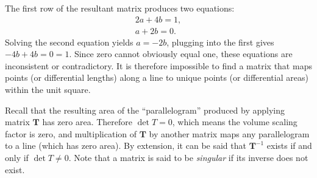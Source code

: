 The first row of the resultant matrix produces two equations:
\begin{subequations}
\begin{align}
  2a + 4b = 1, \\
   a + 2b = 0.
\end{align}
\end{subequations}
Solving the second equation yields $a = -2b$, plugging into the first gives $-4b + 4b = 0 = 1$. Since zero cannot obviously equal one, these equations are inconsistent or contradictory. It is therefore impossible to find a matrix that maps points (or differential lengths) along a line to unique points (or differential areas) within the unit square.

Recall that the resulting area of the ``parallelogram'' produced by applying matrix $\mathbf{T}$ has zero area. Therefore $\det{T} = 0$, which means the volume scaling factor is zero, and multiplication of $\mathbf{T}$ by another matrix maps any parallelogram to a line (which has zero area). By extension, it can be said that $\mathbf{T}^{-1}$ exists if and only if $\det{T} \ne 0$. Note that a matrix is said to be \emph{singular} if its inverse does not exist.

